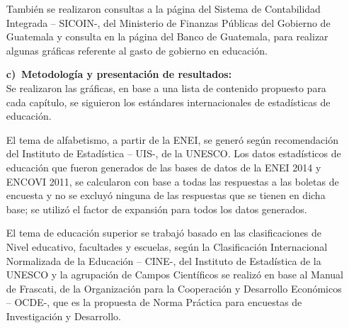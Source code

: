 \begin{itemize}
		 También se realizaron consultas a la página del Sistema de Contabilidad Integrada – SICOIN-, del Ministerio de Finanzas Públicas del Gobierno de Guatemala y consulta en la página del Banco de Guatemala, para realizar algunas gráficas referente al gasto de gobierno en educación.
		
	\item[\large\textbf{c)}$\ $]	\textbf{\large Metodología y presentación de resultados:} \\[-3mm]



 Se realizaron las gráficas, en base a una lista de contenido propuesto para cada capítulo, se siguieron los estándares internacionales de estadísticas de educación. 

 El  tema de alfabetismo, a partir de la ENEI, se generó según recomendación del Instituto de Estadística – UIS-, de la UNESCO. Los datos estadísticos de educación que fueron generados de las bases de datos de la ENEI 2014 y ENCOVI 2011, se calcularon con base a todas las respuestas a las boletas de encuesta y no se excluyó ninguna de las respuestas que se tienen en dicha base; se utilizó el factor de expansión para todos los datos generados.

 El tema de educación superior se trabajó basado en las clasificaciones de Nivel educativo, facultades y escuelas, según la Clasificación Internacional Normalizada de la Educación – CINE-, del Instituto de Estadística de la UNESCO y la agrupación de Campos Científicos se realizó en base al Manual de Frascati, de la Organización para la Cooperación y Desarrollo Económicos – OCDE-, que es la propuesta de Norma Práctica para encuestas de Investigación y Desarrollo.


\end{itemize}


